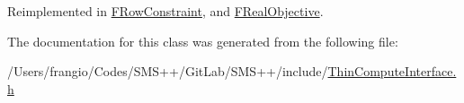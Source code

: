 Reimplemented in \mbox{\hyperlink{class_s_m_spp__di__unipi__it_1_1_f_row_constraint_a0ddaa949b3db7b6adeb4ed8d623637ca}{F\+Row\+Constraint}}, and \mbox{\hyperlink{class_s_m_spp__di__unipi__it_1_1_f_real_objective_a0ddaa949b3db7b6adeb4ed8d623637ca}{F\+Real\+Objective}}.



The documentation for this class was generated from the following file\+:\begin{DoxyCompactItemize}
\item 
/\+Users/frangio/\+Codes/\+S\+M\+S++/\+Git\+Lab/\+S\+M\+S++/include/\mbox{\hyperlink{_thin_compute_interface_8h}{Thin\+Compute\+Interface.\+h}}\end{DoxyCompactItemize}
